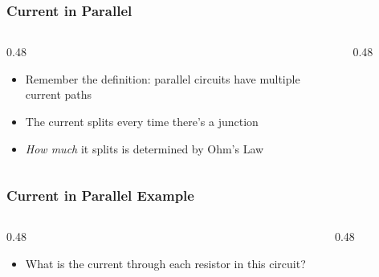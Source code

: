 \begin{frame}
    \frametitle{Current in Parallel}

    \begin{columns}
        \begin{column}{0.48\linewidth}
            \begin{itemize}[<+- | alert@+>]
                \item Remember the definition: parallel circuits have multiple current paths
                \item The current splits every time there's a junction
                \item \emph{How much} it splits is determined by Ohm's Law
            \end{itemize}
        \end{column}
        \begin{column}{0.48\linewidth}
            \begin{figure}
                \centering
                \resizebox{\columnwidth}{!}{
                    
                }
            \end{figure}
        \end{column}
	\end{columns}
\end{frame}

\begin{frame}
    \frametitle{Current in Parallel Example}

    \begin{columns}
        \begin{column}{0.48\linewidth}
            \begin{itemize}[<+- | alert@+>]
                \item What is the current through each resistor in this circuit?
            \end{itemize}
        \end{column}
        \begin{column}{0.48\linewidth}
            \begin{figure}
                \centering
                \resizebox{\columnwidth}{!}{
                    
                }
            \end{figure}
        \end{column}
	\end{columns}
\end{frame}

